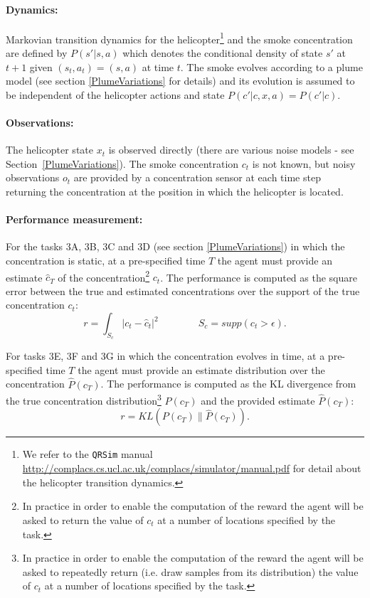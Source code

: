\documentclass[a4paper,11pt]{report}
\newcommand{\webman}{\url{http://complacs.cs.ucl.ac.uk/complacs/simulator/manual.pdf}\xspace}
\begin{document}
\paragraph{Dynamics:} Markovian transition dynamics for the helicopter\footnote{We refer to the \texttt{QRSim} manual \webman for detail about the helicopter transition dynamics.} and the smoke concentration are defined by $P(s'|s,a)$ which denotes the conditional density of state $s'$ at $t+1$ given $(s_t,a_t) = (s,a)$ at time $t$. The smoke evolves according to a plume model (see section \ref{PlumeVariations} for details) and its evolution is assumed to be independent of the helicopter actions and state  $P(c'|c,x,a)=P(c'|c)$.

\paragraph{Observations:} The helicopter state $x_t$ is observed directly (there are various noise models - see Section~\ref{PlumeVariations}). The smoke concentration $c_t$ is not known, but noisy observations $o_t$ are provided by a concentration sensor at each time step returning the concentration at the position in which the helicopter is located.

\paragraph{Performance measurement:} 
For the tasks 3A, 3B, 3C and 3D (see section \ref{PlumeVariations}) in which the concentration is static, at a pre-specified time $T$ the agent must provide an estimate $\hat c_T$ of the concentration\footnote{In practice in order to enable the computation of the reward the agent will be asked to return the value of $c_t$ at a number of locations specified by the task.} $c_t$.
The performance is computed as the square error between the true and estimated concentrations over the support of the true concentration $c_t$:
$$
r = \int_{S_c} | c_t - \hat{c}_t |^2  \qquad\qquad S_c=supp(c_t>\epsilon).
$$

For tasks 3E, 3F and 3G in which the concentration evolves in time, at a pre-specified time $T$ the agent must provide an estimate distribution over the concentration $\hat P(c_T)$.
The performance is computed as the KL divergence from the true concentration distribution\footnote{In practice in order to enable the computation of the reward the agent will be asked to repeatedly return (i.e. draw samples from its distribution) the value of $c_t$ at a number of locations specified by the task.} $P(c_T)$ and the provided estimate $\hat P(c_T)$:
$$
r = KL(P(c_T) \|\hat{P}(c_T)).
$$
\end{document}
